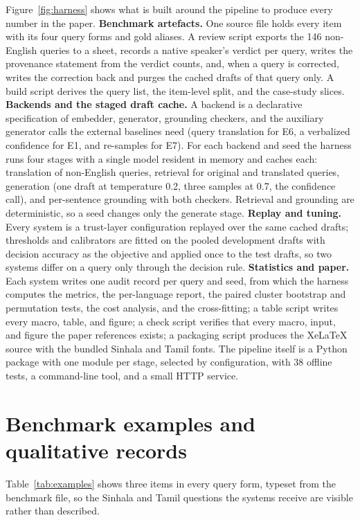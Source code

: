Figure~\ref{fig:harness} shows what is built around the pipeline to produce every number in the paper. \textbf{Benchmark artefacts.} One source file holds every item with its four query forms and gold aliases. A review script exports the 146 non-English queries to a sheet, records a native speaker's verdict per query, writes the provenance statement from the verdict counts, and, when a query is corrected, writes the correction back and purges the cached drafts of that query only. A build script derives the query list, the item-level split, and the case-study slices. \textbf{Backends and the staged draft cache.} A backend is a declarative specification of embedder, generator, grounding checkers, and the auxiliary generator calls the external baselines need (query translation for E6, a verbalized confidence for E1, and re-samples for E7). For each backend and seed the harness runs four stages with a single model resident in memory and caches each: translation of non-English queries, retrieval for original and translated queries, generation (one draft at temperature 0.2, three samples at 0.7, the confidence call), and per-sentence grounding with both checkers. Retrieval and grounding are deterministic, so a seed changes only the generate stage. \textbf{Replay and tuning.} Every system is a trust-layer configuration replayed over the same cached drafts; thresholds and calibrators are fitted on the pooled development drafts with decision accuracy as the objective and applied once to the test drafts, so two systems differ on a query only through the decision rule. \textbf{Statistics and paper.} Each system writes one audit record per query and seed, from which the harness computes the metrics, the per-language report, the paired cluster bootstrap and permutation tests, the cost analysis, and the cross-fitting; a table script writes every macro, table, and figure; a check script verifies that every macro, input, and figure the paper references exists; a packaging script produces the XeLaTeX source with the bundled Sinhala and Tamil fonts. The pipeline itself is a Python package with one module per stage, selected by configuration, with 38 offline tests, a command-line tool, and a small HTTP service.

\section{Benchmark examples and qualitative records}
Table~\ref{tab:examples} shows three items in every query form, typeset from the benchmark file, so the Sinhala and Tamil questions the systems receive are visible rather than described.


